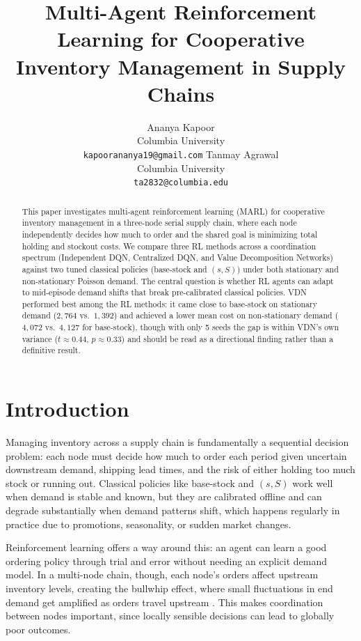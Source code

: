 \documentclass{article}
\title{Multi-Agent Reinforcement Learning for Cooperative\\
Inventory Management in Supply Chains}
\author{
  Ananya Kapoor \\
  Columbia University \\
  \texttt{kapoorananya19@gmail.com}
  \And
  Tanmay Agrawal \\
  Columbia University \\
  \texttt{ta2832@columbia.edu}
}
\begin{document}
\maketitle

\begin{abstract}
This paper investigates multi-agent reinforcement learning (MARL) for
cooperative inventory management in a three-node serial supply chain,
where each node independently decides how much to order and the
shared goal is minimizing total holding and stockout costs. We
compare three RL methods across a coordination spectrum (Independent
DQN, Centralized DQN, and Value Decomposition Networks) against
two tuned classical policies (base-stock and $(s,S)$) under both
stationary and non-stationary Poisson demand. The central question is
whether RL agents can adapt to mid-episode demand shifts that break
pre-calibrated classical policies. VDN performed best among the RL
methods: it came close to base-stock on stationary demand
($2{,}764$ vs.\ $1{,}392$) and achieved a lower mean cost on
non-stationary demand ($4{,}072$ vs.\ $4{,}127$ for base-stock),
though with only 5 seeds the gap is within VDN's own variance
($t \approx 0.44$, $p \approx 0.33$) and should be read as a
directional finding rather than a definitive result.
\end{abstract}

\section{Introduction}

Managing inventory across a supply chain is fundamentally a sequential
decision problem: each node must decide how much to order each period
given uncertain downstream demand, shipping lead times, and the risk of
either holding too much stock or running out. Classical policies like
base-stock and $(s,S)$ work well when demand is stable and known, but
they are calibrated offline and can degrade substantially when demand
patterns shift, which happens regularly in practice due to promotions,
seasonality, or sudden market changes.

Reinforcement learning offers a way around this: an agent can learn a
good ordering policy through trial and error without needing an explicit
demand model. In a multi-node chain, though, each node's orders affect
upstream inventory levels, creating the bullwhip effect, where small
fluctuations in end demand get amplified as orders travel upstream
\cite{lee1997bullwhip}. This makes coordination between nodes important,
since locally sensible decisions can lead to globally poor outcomes.
\end{document}

